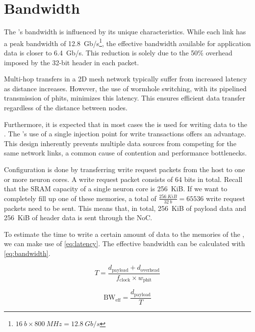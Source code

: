 \section{Bandwidth}
The \confignoc{}'s bandwidth is influenced by its unique characteristics.
While each link has a peak bandwidth of \SI{12.8}{Gb/s}\footnote{$\SI{16}{b} \times \SI{800}{MHz} = \SI{12.8}{Gb/s}$}, the effective bandwidth available for application data is closer to \SI{6.4}{Gb/s}.
This reduction is solely due to the 50\% overhead imposed by the 32-bit header in each packet.

Multi-hop transfers in a 2D mesh network typically suffer from increased latency as distance increases.
However, the use of wormhole switching, with its pipelined transmission of phits, minimizes this latency.
This ensures efficient data transfer regardless of the distance between nodes.

Furthermore, it is expected that in most cases the \confignoc{} is used for writing data to the \graicore{}.
The \confignoc{}'s use of a single injection point for write transactions offers an advantage.
This design inherently prevents multiple data sources from competing for the same network links, a common cause of contention and performance bottlenecks.

Configuration is done by transferring write request packets from the host to one or more neuron cores.
A write request packet consists of 64 bits in total.
Recall that the SRAM capacity of a single neuron core is \SI{256}{KiB}.
If we want to completely fill up one of these memories, a total of $\frac{\SI{256}{KiB}}{\SI{32}{b}} = \num{65536}$ write request packets need to be sent.
This means that, in total, \SI{256}{KiB} of payload data and \SI{256}{KiB} of header data is sent through the NoC.

To estimate the time to write a certain amount of data to the memories of the \graicore{}, we can make use of \cref{eq:latency}.
The effective bandwidth can be calculated with \cref{eq:bandwidth}.

\begin{equation} \label{eq:latency}
    T = 
    \frac{d_{\text{payload}} + d_{\text{overhead}}}
    {f_{\text{clock}} \times w_{\text{phit}}}
\end{equation}

\begin{equation} \label{eq:bandwidth}
    \text{BW}_{\text{eff}} =
    \frac{d_\text{payload}}{T}
\end{equation}

